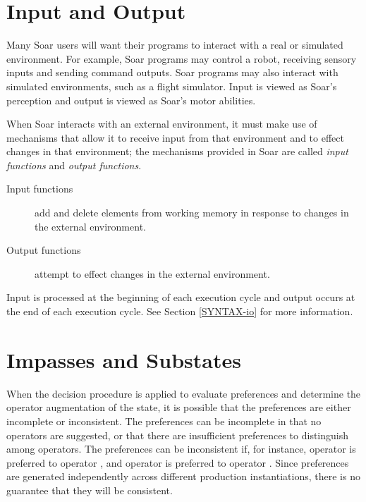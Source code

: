\section{Input and Output}
\label{ARCH-io}	%

Many Soar users will want their programs to interact with a real or simulated environment. For example, Soar programs may control a robot, receiving sensory inputs and sending command outputs. Soar programs may also interact with simulated environments, such as a flight simulator. Input is viewed as Soar's perception and output is viewed as Soar's motor abilities.

When Soar interacts with an external environment, it must make use of mechanisms that allow it to receive input from that environment and to effect changes in that environment; the mechanisms provided in Soar are called \textit{input functions} and \textit{output functions}.

\vspace{-12pt}
\begin{description}
	\item[Input functions] add and delete elements from working memory in response to changes in the external environment.
	\vspace{-6pt}
	\item[Output functions] attempt to effect changes in the external environment.
	\vspace{-6pt}
\end{description}

Input is processed at the beginning of each execution cycle and output occurs at the end of each execution cycle. See Section \ref{SYNTAX-io} for more information.


\section{Impasses and Substates}
\label{ARCH-impasses}

When the decision procedure is applied to evaluate preferences and determine the operator augmentation of the state, it is possible that the preferences are either incomplete or inconsistent. The preferences can be incomplete in that no  operators are suggested, or that there are insufficient preferences to distinguish among  operators. The preferences can be inconsistent if, for instance, operator  is preferred to operator , and operator  is preferred to operator . Since preferences are generated independently across different production instantiations, there is no guarantee that they will be consistent.


